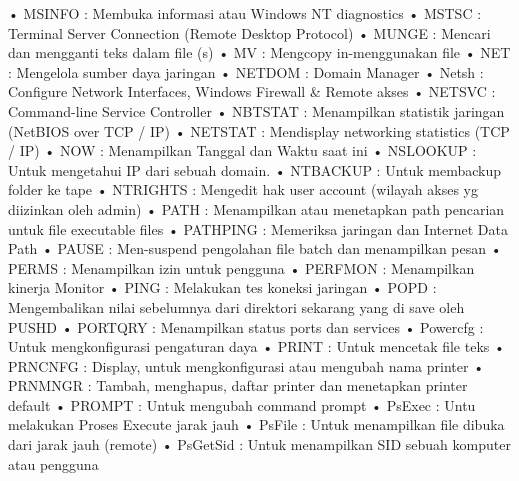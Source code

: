 \documentclass{article}
\begin{document}
• MSINFO : Membuka informasi atau Windows NT diagnostics
• MSTSC : Terminal Server Connection (Remote Desktop Protocol)
• MUNGE : Mencari dan mengganti teks dalam file (s)
• MV : Mengcopy in-menggunakan file
• NET : Mengelola sumber daya jaringan
• NETDOM : Domain Manager
• Netsh : Configure Network Interfaces, Windows Firewall & Remote akses
• NETSVC : Command-line Service Controller
• NBTSTAT : Menampilkan statistik jaringan (NetBIOS over TCP / IP)
• NETSTAT : Mendisplay networking statistics (TCP / IP)
• NOW : Menampilkan  Tanggal dan Waktu saat ini
• NSLOOKUP : Untuk mengetahui IP dari sebuah domain.
• NTBACKUP : Untuk membackup  folder ke tape
• NTRIGHTS : Mengedit hak user account (wilayah akses yg diizinkan oleh admin)
• PATH : Menampilkan atau menetapkan path pencarian untuk file executable files
• PATHPING : Memeriksa jaringan dan Internet Data Path
• PAUSE : Men-suspend pengolahan file batch dan menampilkan pesan
• PERMS : Menampilkan izin untuk pengguna
• PERFMON : Menampilkan kinerja Monitor
• PING : Melakukan tes koneksi jaringan
• POPD : Mengembalikan nilai sebelumnya dari direktori sekarang yang di save oleh PUSHD
• PORTQRY : Menampilkan status ports dan services
• Powercfg : Untuk mengkonfigurasi pengaturan daya
• PRINT : Untuk mencetak file teks
• PRNCNFG : Display, untuk mengkonfigurasi atau mengubah nama printer
• PRNMNGR : Tambah, menghapus, daftar printer dan menetapkan printer default
• PROMPT : Untuk mengubah command prompt
• PsExec : Untu melakukan Proses Execute jarak jauh
• PsFile : Untuk menampilkan file dibuka dari jarak jauh (remote)
• PsGetSid : Untuk menampilkan SID sebuah komputer atau pengguna
\end{document}
